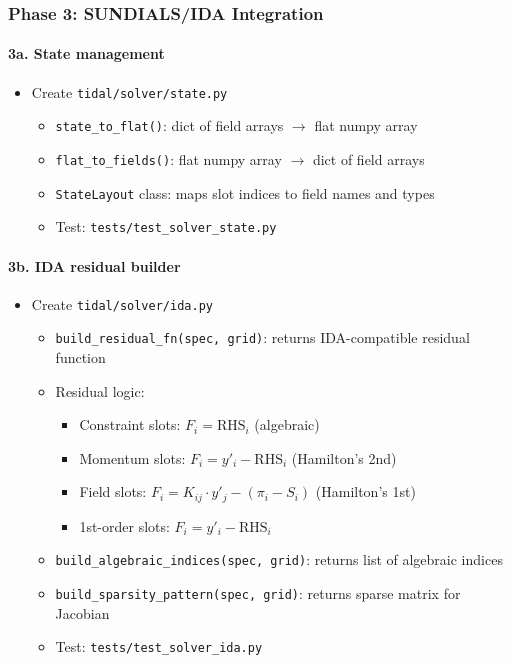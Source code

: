 \subsubsection{Phase 3: SUNDIALS/IDA Integration}
\label{sec:phase3}

\paragraph{3a. State management}
\label{par:state-mgmt}

\begin{itemize}
  \item[$\square$] Create \texttt{tidal/solver/state.py}
  \begin{itemize}
    \item \texttt{state\_to\_flat()}: dict of field arrays $\to$ flat numpy array
    \item \texttt{flat\_to\_fields()}: flat numpy array $\to$ dict of field arrays
    \item \texttt{StateLayout} class: maps slot indices to field names and types
    \item Test: \texttt{tests/test\_solver\_state.py}
  \end{itemize}
\end{itemize}

\paragraph{3b. IDA residual builder}
\label{par:ida-residual}

\begin{itemize}
  \item[$\square$] Create \texttt{tidal/solver/ida.py}
  \begin{itemize}
    \item \texttt{build\_residual\_fn(spec, grid)}: returns IDA-compatible residual function
    \item Residual logic:
    \begin{itemize}
      \item Constraint slots: $F_i = \mathrm{RHS}_i$ (algebraic)
      \item Momentum slots: $F_i = y'_i - \mathrm{RHS}_i$ (Hamilton's 2nd)
      \item Field slots: $F_i = K_{ij} \cdot y'_j - (\pi_i - S_i)$ (Hamilton's 1st)
      \item 1st-order slots: $F_i = y'_i - \mathrm{RHS}_i$
    \end{itemize}
    \item \texttt{build\_algebraic\_indices(spec, grid)}: returns list of algebraic indices
    \item \texttt{build\_sparsity\_pattern(spec, grid)}: returns sparse matrix for Jacobian
    \item Test: \texttt{tests/test\_solver\_ida.py}
  \end{itemize}
\end{itemize}

